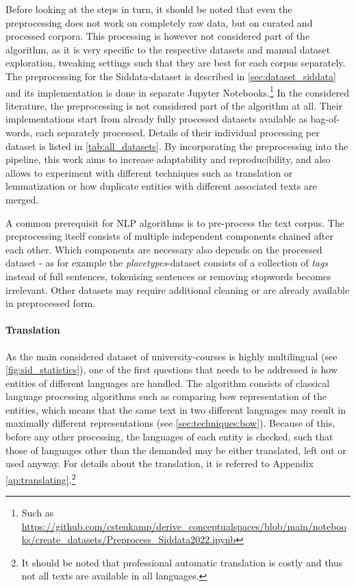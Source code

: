 \label{sec:algo_preproc}

Before looking at the steps in turn, it should be noted that even the preprocessing does not work on completely raw data, but on curated and processed corpora. This processing is however not considered part of the algorithm, as it is very specific to the respective datasets and manual dataset exploration, tweaking settings such that they are best for each corpus separately. The preprocessing for the Siddata-dataset is described in \autoref{sec:dataset_siddata} and its implementation is done in separate Jupyter Notebooks.\footnote{Such as \url{https://github.com/cstenkamp/derive_conceptualspaces/blob/main/notebooks/create_datasets/Preprocess_Siddata2022.ipynb}} In the considered literature, the preprocessing is not considered part of the algorithm at all. Their implementations start from already fully processed datasets available as bag-of-words, each separately processed. Details of their individual processing per dataset is listed in \autoref{tab:all_datasets}. By incorporating the preprocessing into the pipeline, this work aims to increase adaptability and reproducibility, and also allows to experiment with different techniques such as translation or lemmatization or how duplicate entities with different associated texts are merged.


A common prerequisit for NLP algorithms is to pre-process the text corpus. The preprocessing itself consists of multiple independent components chained after each other. Which components are necessary also depends on the processed dataset - as for example the \emph{placetypes}-dataset consists of a collection of \textit{tags} instead of full sentences, tokenising sentences or removing \glspl{stopword} becomes irrelevant. Other datasets may require additional cleaning or are already available in preprocessed form.

\paragraph{Translation} As the main considered dataset of university-courses is highly multilingual (see \autoref{fig:sid_statistics}), one of the first questions that needs to be addressed is how entities of different languages are handled. The algorithm consists of classical language processing algorithms such as comparing \gls{bow} representation of the entities, which means that the same text in two different languages may result in maximally different representations (see \autoref{sec:techniques:bow}). Because of this, before any other processing, the languages of each entity is checked, such that those of languages other than the demanded may be either translated, left out or used anyway. For details about the translation, it is referred to Appendix \ref{ap:translating}.\footnote{It should be noted that professional automatic translation is costly and thus not all texts are available in all languages.}

